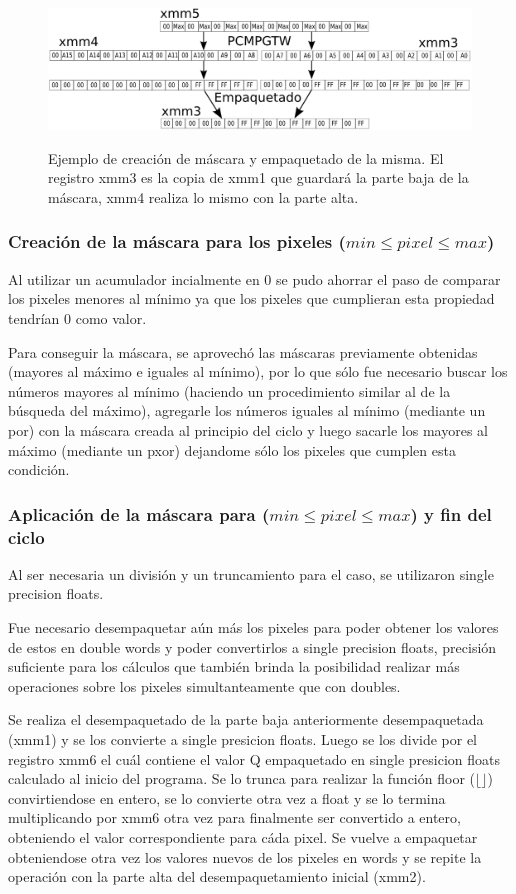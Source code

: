 \begin{figure}[H]
\centering
\includegraphics[width=150mm, height=40mm]{cpmmax.png}
\caption{Ejemplo de creación de máscara y empaquetado de la misma. El registro xmm3 es la copia de xmm1 que guardará la parte baja de la máscara, xmm4 realiza lo mismo con la parte alta.}
\label{overflow}
\end{figure}

\subsubsection{Creación de la máscara para los pixeles ($min \leq pixel \leq max$)}
Al utilizar un acumulador incialmente en 0 se pudo ahorrar el paso de comparar los pixeles menores al mínimo ya que los pixeles que cumplieran esta propiedad tendrían 0 como valor.

Para conseguir la máscara, se aprovechó las máscaras previamente obtenidas (mayores al máximo e iguales al mínimo), por lo que sólo fue necesario buscar los números mayores al mínimo (haciendo un procedimiento similar al de la búsqueda del máximo), agregarle los números iguales al mínimo (mediante un por) con la máscara creada al principio del ciclo y luego sacarle los mayores al máximo (mediante un pxor) dejandome sólo los pixeles que cumplen esta condición.

\subsubsection{Aplicación de la máscara para ($min \leq pixel \leq max$) y fin del ciclo}
Al ser necesaria un división y un truncamiento para el caso, se utilizaron single precision floats.

Fue necesario desempaquetar aún más los pixeles para poder obtener los valores de estos en double words y poder convertirlos a single precision floats, precisión suficiente para los cálculos que también brinda la posibilidad realizar más operaciones sobre los pixeles simultanteamente que con doubles.

Se realiza el desempaquetado de la parte baja anteriormente desempaquetada (xmm1) y se los convierte a single presicion floats. Luego se los divide por el registro xmm6 el cuál contiene el valor Q empaquetado en single presicion floats calculado al inicio del programa. Se lo trunca para realizar la función floor ($\lfloor \rfloor$) convirtiendose en entero, se lo convierte otra vez a float y se lo termina multiplicando por xmm6 otra vez para finalmente ser convertido a entero, obteniendo el valor correspondiente para cáda pixel. Se vuelve a empaquetar obteniendose otra vez los valores nuevos de los pixeles en words y se repite la operación con la parte alta del desempaquetamiento inicial (xmm2).

